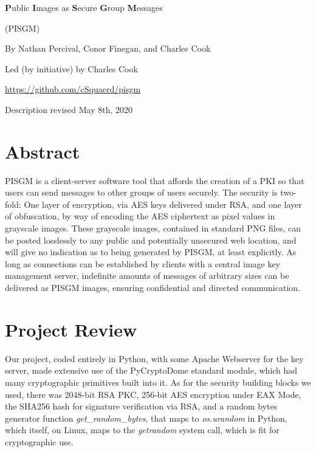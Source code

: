 \documentclass[12pt]{article}
\begin{document}
	\Large
	\begin{Center}
		\textbf{P}ublic \textbf{I}mages as
		\textbf{S}ecure \textbf{G}roup \textbf{M}essages

		(PISGM)

		\large
		By Nathan Percival, Conor Finegan, and Charles Cook

		Led (by initiative) by Charles Cook

		\normalsize
		\underline{https://github.com/cSquaerd/pisgm}

		Description revised May 8th, 2020
	\end{Center}
	\normalsize
	\begin{FlushLeft}
		\section{Abstract}
			PISGM is a client-server software tool that affords the creation of a PKI so that users can send messages to other groups of users securely.
			The security is two-fold: One layer of encryption, via AES keys delivered under RSA, and one layer of obfuscation, by way of encoding the AES ciphertext as pixel values in grayscale images.
			These grayscale images, contained in standard PNG files, can be posted losslessly to any public and potentially unsecured web location, and will give no indication as to being generated by PISGM, at least explicitly.
			As long as connections can be established by clients with a central image key management server, indefinite amounts of messages of arbitrary sizes can be \linebreak delivered as PISGM images, ensuring confidential and directed communication.
			\pagebreak

		\section{Project Review}
			Our project, coded entirely in Python, with some Apache Webserver for the key server, made extensive use of the PyCryptoDome standard module, which had many cryptographic primitives built into it.
			As for the security building blocks we used, there was 2048-bit RSA PKC, 256-bit AES encryption under EAX Mode, the SHA256 hash for signature verification via RSA, and a random bytes generator function \textit{get\_random\_bytes}, that maps to \textit{os.urandom} in Python, which itself, on Linux, maps to the \textit{getrandom} system call, which is fit for cryptographic use.
			\linebreak


\end{FlushLeft}
\end{document}
